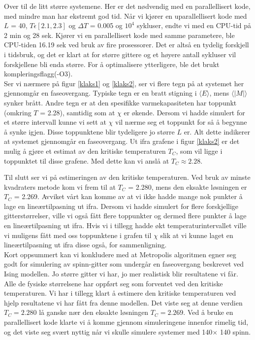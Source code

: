 \documentclass[11pt,a4paper]{article}
\begin{document}
Over til de litt større systemene. Her er det nødvendig med en parallellisert kode, med mindre man har ekstremt god tid. Når vi kjører en uparallellisert kode med $L$ = 40, $T \epsilon [2.1, 2.3]$ og $\Delta T$ = 0.005 og $10^4$ sykluser, endte vi med en CPU-tid på  2 min og 28 sek. Kjører vi en parallellisert kode med samme parametere, ble CPU-tiden 16.19 sek ved bruk av fire prosessorer. Det er altså en tydelig forskjell i tidsbruk, og det er klart at for større gittere og et høyere antall sykluser vil forskjellene bli enda større. For å optimalisere ytterligere, ble det brukt kompleringsflagg(-O3). \\

Ser vi nærmere på figur \ref{klaks1} og \ref{klaks2}, ser vi flere tegn på at systemet her gjennomgår en faseovergang. Typiske tegn er en bratt stigning i $\langle E \rangle$, mens $\langle |M| \rangle$ synker brått. Andre tegn er at den spesifikke varmekapasiteten har toppunkt (omkring $T$ = 2.28), samtidig som at $\chi$ er økende. Dersom vi hadde simulert for et større intervall kunne vi sett at $\chi$ vil nærme seg et toppunkt for så å begynne å synke igjen. Disse toppunktene blir tydeligere jo større $L$ er. Alt dette indikerer at systemet gjennomgår en faseovergang. Ut ifra grafene i figur \ref{klaks2} er det mulig å gjøre et estimat av den kritiske temperaturen $T_C$, som vil ligge i toppunktet til disse grafene. Med dette kan vi anslå at $T_C \approx 2.28$.

Til slutt ser vi på estimeringen av den kritiske temperaturen. Ved bruk av minste kvadraters metode kom vi frem til at $T_C$ = 2.280, mens den eksakte løsningen er $T_C$ = 2.269. Avviket vårt kan komme av at vi ikke hadde mange nok punkter å lage en lineærtilpasning ut ifra. Dersom vi hadde simulert for flere forskjellige gitterstørrelser, ville vi også fått flere toppunkter og dermed flere punkter å lage en lineærtilpasning ut ifra. Hvis vi i tillegg hadde økt temperaturintervallet ville vi muligens fått med oss toppunktene i grafen til $\chi$ slik at vi kunne laget en lineærtilpasning ut ifra disse også, for sammenligning. \\

Kort oppsummert kan vi konkludere med at Metropolis algoritmen egner seg godt for simulering av spinn-gitter som undergår en faseovergang beskrevet ved Ising modellen. Jo større gitter vi har, jo mer realistisk blir resultatene vi får. Alle de fysiske størrelsene har oppført seg som forventet ved den kritiske temperaturen. Vi har i tillegg klart å estimere den kritiske temperaturen ved hjelp resultatene vi har fått fra denne modellen. Det viste seg at denne verdien $T_C = 2.280$ lå ganske nær den eksakte løsningen $T_C = 2.269$. Ved å bruke en parallellisert kode klarte vi å komme gjennom simuleringene innenfor rimelig tid, og det viste seg svært nyttig når vi skulle simulere  systemer med 140$\times$ 140 spinn.
\end{document}
